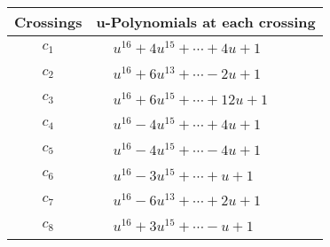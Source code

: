 \documentclass[1p]{elsarticle_modified}
\theoremstyle{definition}
\begin{document}
\begin{tabular}{m{50pt}|m{274pt}}
Crossings & \hspace{64pt}u-Polynomials at each crossing \\
\hline $$\begin{aligned}c_{1}\end{aligned}$$&$\begin{aligned}
&u^{16}+4 u^{15}+\cdots+4 u+1
\end{aligned}$\\
\hline $$\begin{aligned}c_{2}\end{aligned}$$&$\begin{aligned}
&u^{16}+6 u^{13}+\cdots-2 u+1
\end{aligned}$\\
\hline $$\begin{aligned}c_{3}\end{aligned}$$&$\begin{aligned}
&u^{16}+6 u^{15}+\cdots+12 u+1
\end{aligned}$\\
\hline $$\begin{aligned}c_{4}\end{aligned}$$&$\begin{aligned}
&u^{16}-4 u^{15}+\cdots+4 u+1
\end{aligned}$\\
\hline $$\begin{aligned}c_{5}\end{aligned}$$&$\begin{aligned}
&u^{16}-4 u^{15}+\cdots-4 u+1
\end{aligned}$\\
\hline $$\begin{aligned}c_{6}\end{aligned}$$&$\begin{aligned}
&u^{16}-3 u^{15}+\cdots+u+1
\end{aligned}$\\
\hline $$\begin{aligned}c_{7}\end{aligned}$$&$\begin{aligned}
&u^{16}-6 u^{13}+\cdots+2 u+1
\end{aligned}$\\
\hline $$\begin{aligned}c_{8}\end{aligned}$$&$\begin{aligned}
&u^{16}+3 u^{15}+\cdots- u+1
\end{aligned}$\\

\end{tabular}
\end{document}
